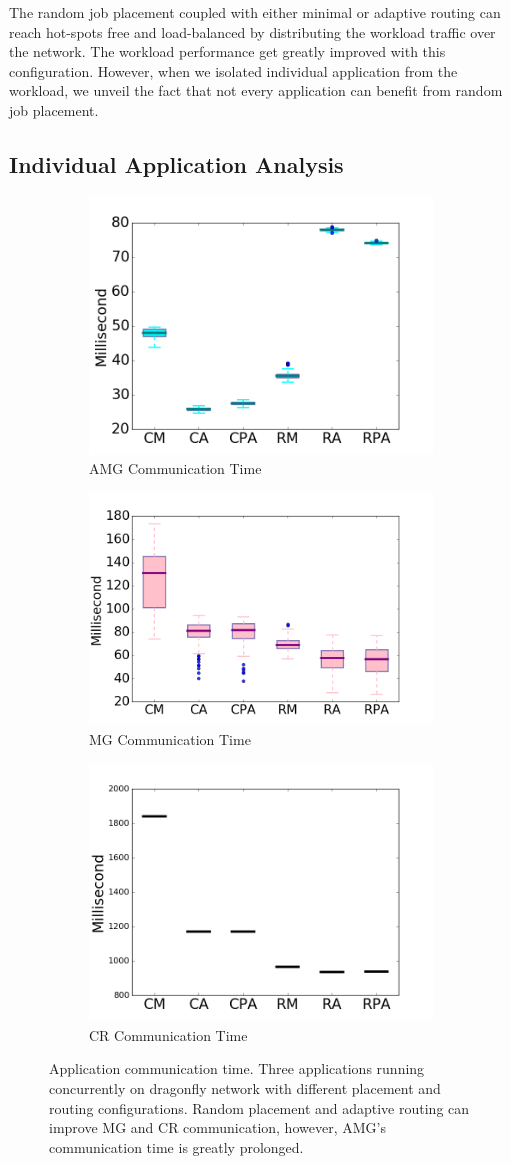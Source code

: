 \documentclass[conference,compsoc]{IEEEtran}
\begin{document}
The random job placement coupled with either minimal or adaptive routing can reach hot-spots free and load-balanced by distributing the workload traffic over the network. The workload performance get greatly improved with this configuration. However, when we isolated individual application from the workload, we unveil the fact that not every application can benefit from random job placement. 


\subsection{Individual Application Analysis}

\begin{figure}[t!]
    \centering
    \begin{subfigure}[t]{0.32\textwidth}
        \centering
        \includegraphics[height=1.5 in]{wkld/amg/commtime}
        \caption{AMG Communication Time}
        \label{fig:amg-commtime}
    \end{subfigure}%
    \hspace{1em}%
    \begin{subfigure}[t]{0.32\textwidth}
        \centering
        \includegraphics[height=1.5 in]{wkld/mg/commtime}
        \caption{MG Communication Time}
        \label{fig:mg-commtime}
    \end{subfigure}%
    \begin{subfigure}[t]{0.32\textwidth}
        \centering
        \includegraphics[height=1.5 in]{wkld/cr/commtime}
        \caption{CR Communication Time}
        \label{fig:cr-commtime}
    \end{subfigure}%
   \caption{Application communication time. Three applications running concurrently on dragonfly network with different placement and routing configurations. Random placement and adaptive routing can improve MG and CR communication, however, AMG's communication time is greatly prolonged.}
   \label{fig:apps-commtime}
\end{figure}
\end{document}
